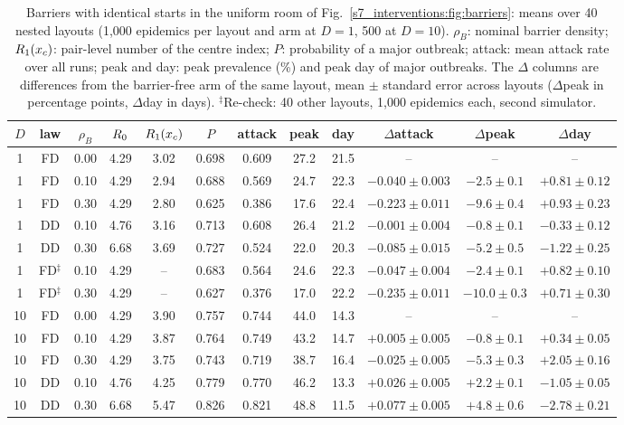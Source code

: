 \begin{table}[tbp]
  \centering\footnotesize\setlength{\tabcolsep}{3.5pt}
  \caption{Barriers with identical starts in the uniform room of Fig.~\ref{s7_interventions:fig:barriers}:
  means over 40 nested layouts (1,000 epidemics per layout and arm at $D=1$, 500 at $D=10$). $\rho_B$: nominal
  barrier density; $R_1(x_c)$: pair-level number of the centre index; $P$: probability of a major outbreak;
  attack: mean attack rate over all runs; peak and day: peak prevalence (\%) and peak day of major outbreaks.
  The $\Delta$ columns are differences from the barrier-free arm of the same layout, mean $\pm$ standard error
  across layouts ($\Delta$peak in percentage points, $\Delta$day in days). $^{\ddagger}$Re-check:
  40 other layouts, 1,000 epidemics each, second simulator.}
  \label{s7_interventions:tab:barriers}
  \begin{tabular}{@{}cccccccccccc@{}}
    \toprule
    $D$ & law & $\rho_B$ & $R_0$ & $R_1(x_c)$ & $P$ & attack & peak & day & $\Delta$attack & $\Delta$peak & $\Delta$day \\
    \midrule
    1 & FD & 0.00 & 4.29 & 3.02 & 0.698 & 0.609 & 27.2 & 21.5 & -- & -- & -- \\
    1 & FD & 0.10 & 4.29 & 2.94 & 0.688 & 0.569 & 24.7 & 22.3 & $-0.040\pm0.003$ & $-2.5\pm0.1$ & $+0.81\pm0.12$ \\
    1 & FD & 0.30 & 4.29 & 2.80 & 0.625 & 0.386 & 17.6 & 22.4 & $-0.223\pm0.011$ & $-9.6\pm0.4$ & $+0.93\pm0.23$ \\
    1 & DD & 0.10 & 4.76 & 3.16 & 0.713 & 0.608 & 26.4 & 21.2 & $-0.001\pm0.004$ & $-0.8\pm0.1$ & $-0.33\pm0.12$ \\
    1 & DD & 0.30 & 6.68 & 3.69 & 0.727 & 0.524 & 22.0 & 20.3 & $-0.085\pm0.015$ & $-5.2\pm0.5$ & $-1.22\pm0.25$ \\
    1 & FD$^{\ddagger}$ & 0.10 & 4.29 & -- & 0.683 & 0.564 & 24.6 & 22.3 & $-0.047\pm0.004$ & $-2.4\pm0.1$ & $+0.82\pm0.10$ \\
    1 & FD$^{\ddagger}$ & 0.30 & 4.29 & -- & 0.627 & 0.376 & 17.0 & 22.2 & $-0.235\pm0.011$ & $-10.0\pm0.3$ & $+0.71\pm0.30$ \\
    \midrule
    10 & FD & 0.00 & 4.29 & 3.90 & 0.757 & 0.744 & 44.0 & 14.3 & -- & -- & -- \\
    10 & FD & 0.10 & 4.29 & 3.87 & 0.764 & 0.749 & 43.2 & 14.7 & $+0.005\pm0.005$ & $-0.8\pm0.1$ & $+0.34\pm0.05$ \\
    10 & FD & 0.30 & 4.29 & 3.75 & 0.743 & 0.719 & 38.7 & 16.4 & $-0.025\pm0.005$ & $-5.3\pm0.3$ & $+2.05\pm0.16$ \\
    10 & DD & 0.10 & 4.76 & 4.25 & 0.779 & 0.770 & 46.2 & 13.3 & $+0.026\pm0.005$ & $+2.2\pm0.1$ & $-1.05\pm0.05$ \\
    10 & DD & 0.30 & 6.68 & 5.47 & 0.826 & 0.821 & 48.8 & 11.5 & $+0.077\pm0.005$ & $+4.8\pm0.6$ & $-2.78\pm0.21$ \\
    \bottomrule
  \end{tabular}
\end{table}

